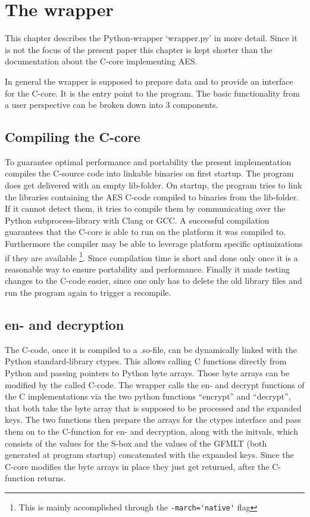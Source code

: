 \hypertarget{the-wrapper}{%
\section{The wrapper}\label{the-wrapper}}

This chapter describes the Python-wrapper `wrapper.py' in more detail.
Since it is not the focus of the present paper this chapter is kept
shorter than the documentation about the C-core implementing AES.

In general the wrapper is supposed to prepare data and to provide an
interface for the C-core. It is the entry point to the program. The
basic functionality from a user perspective can be broken down into 3
components.

\hypertarget{compiling-the-c-core}{%
\subsection{Compiling the C-core}\label{compiling-the-c-core}}

To guarantee optimal performance and portability the present
implementation compiles the C-source code into linkable binaries on
first startup. The program does get delivered with an empty lib-folder.
On startup, the program tries to link the libraries containing the AES
C-code compiled to binaries from the lib-folder. If it cannot detect
them, it tries to compile them by communicating over the Python
subprocess-library with Clang or GCC. A successful compilation
guarantees that the C-core is able to run on the platform it was
compiled to. Furthermore the compiler may be able to leverage platform
specific optimizations if they are available \footnote{This is mainly accomplished through the \lstinline{-march='native'} flag}. Since compilation time is
short and done only once it is a reasonable way to ensure portability
and performance. Finally it made testing changes to the C-code easier,
since one only has to delete the old library files and run the program
again to trigger a recompile.

\hypertarget{en--and-decryption}{%
\subsection{en- and decryption}\label{en--and-decryption}}

The C-code, once it is compiled to a .so-file, can be dynamically linked
with the Python standard-library ctypes. This allows calling C functions
directly from Python and passing pointers to Python byte arrays. Those
byte arrays can be modified by the called C-code. The wrapper
calls the en- and decrypt functions of the C implementations via the two
python functions ``encrypt'' and ``decrypt'', that both take the byte
array that is supposed to be processed and the expanded keys. The two
functions then prepare the arrays for the ctypes interface and pass them
on to the C-function for en- and decryption, along with the initvals,
which consists of the values for the S-box and the values of the GFMLT
(both generated at program startup) concatenated with the expanded keys.
Since the C-core modifies the byte arrays in place they just get
returned, after the C-function returns.

